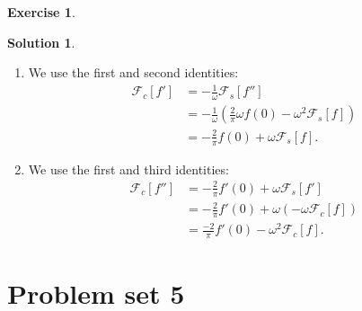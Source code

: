 \documentclass{book}
\theoremstyle{definition}
\newtheorem*{exer*}{Exercise}
\newtheorem*{sln*}{Solution}
\newcommand{\F}{\mathcal{F}}
\begin{document}
\begin{exer*}
\begin{sln*}
\begin{enumerate}
		
		
		
		\item We use the first and second identities:
		\begin{align*}
		\F_c[f'] &= -\frac{1}{\omega}\F_s[f'']\\
		&= -\frac{1}{\omega}\left( \frac{2}{\pi}\omega f(0) - \omega^2 \F_s[f]  \right)\\
		&= -\frac{2}{\pi} f(0) + \omega \F_s[f].
		\end{align*}
		
		\item We use the first and third identities:
		\begin{align*}
		\F_c[f''] &= -\frac{2}{\pi} f'(0) + \omega \F_s[f']\\
		&= -\frac{2}{\pi} f'(0) + \omega\left(-\omega \F_c[f]\right)\\
		&=  \frac{-2}{\pi} f'(0) - \omega^2 \F_c[f].
		\end{align*}
		
		
	\end{enumerate}
	
\end{sln*}

\end{exer*}



\newpage
\section{Problem set 5}
\end{document}
